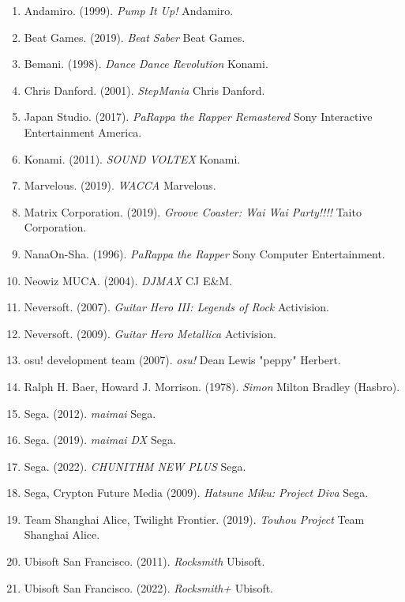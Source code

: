 \begin{enumerate}
    \item Andamiro. (1999). \textit{Pump It Up!} Andamiro.
    \item Beat Games. (2019). \textit{Beat Saber} Beat Games.
    \item Bemani. (1998). \textit{Dance Dance Revolution} Konami.
    \item Chris Danford. (2001). \textit{StepMania} Chris Danford.
    \item Japan Studio. (2017). \textit{PaRappa the Rapper Remastered} Sony Interactive Entertainment America.
    \item Konami. (2011). \textit{SOUND VOLTEX} Konami.
    \item Marvelous. (2019). \textit{WACCA} Marvelous.
    \item Matrix Corporation. (2019). \textit{Groove Coaster: Wai Wai Party!!!!} Taito Corporation.
    \item NanaOn-Sha. (1996). \textit{PaRappa the Rapper} Sony Computer Entertainment.
    \item Neowiz MUCA. (2004). \textit{DJMAX} CJ E\&M.
    \item Neversoft. (2007). \textit{Guitar Hero III: Legends of Rock} Activision.
    \item Neversoft. (2009). \textit{Guitar Hero Metallica} Activision.
    \item osu! development team (2007). \textit{osu!} Dean Lewis "peppy" Herbert.
    \item Ralph H. Baer, Howard J. Morrison. (1978). \textit{Simon} Milton Bradley (Hasbro).
    \item Sega. (2012). \textit{maimai} Sega.
    \item Sega. (2019). \textit{maimai DX} Sega.
    \item Sega. (2022). \textit{CHUNITHM NEW PLUS} Sega.
    \item Sega, Crypton Future Media (2009). \textit{Hatsune Miku: Project Diva} Sega.
    \item Team Shanghai Alice, Twilight Frontier. (2019). \textit{Touhou Project} Team Shanghai Alice.
    \item Ubisoft San Francisco. (2011). \textit{Rocksmith} Ubisoft.
    \item Ubisoft San Francisco. (2022). \textit{Rocksmith+} Ubisoft.
\end{enumerate}